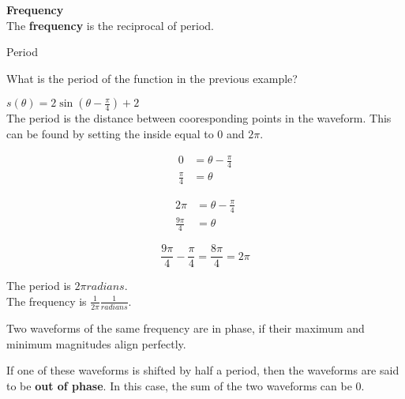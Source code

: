 \documentclass{ximera}
\begin{document}
\begin{definition} \textbf{\textcolor{green!50!black}{Frequency}} \\

The \textbf{frequency} is the reciprocal of period.

\end{definition}














\begin{example}  Period

What is the period of the function in the previous example?



\begin{explanation}

$s(\theta) = 2 \sin\left(\theta - \frac{\pi}{4}\right) + 2$ \\


The period is the distance between cooresponding points in the waveform.  This can be found by setting the inside equal to $0$ and $2\pi$.

\begin{align*}
 0 & = \theta - \frac{\pi}{4} \\
 \frac{\pi}{4} & = \theta 
 \end{align*}

\begin{align*}
 2 \pi & = \theta - \frac{\pi}{4} \\
 \frac{9\pi}{4} & = \theta 
 \end{align*}

\[
\frac{9\pi}{4} - \frac{\pi}{4} = \frac{8\pi}{4} = 2 \pi
\]


\end{explanation}

The period is $2\pi radians$. \\

The frequency is $\frac{1}{2\pi} \tfrac{1}{radians}$. \\

\end{example}






Two waveforms of the same frequency are in phase, if their maximum and minimum magnitudes align perfectly.

If one of these waveforms is shifted by half a period, then the waveforms are said to be \textbf{out of phase}. In this case, the sum of the two waveforms can be $0$.
\end{document}
